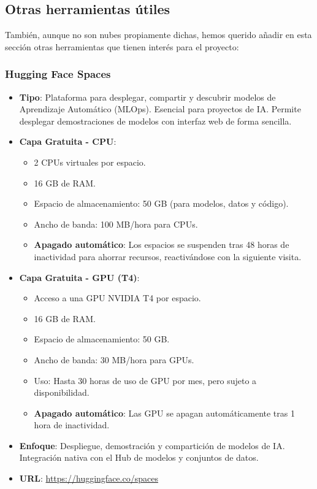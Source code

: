 \subsection{Otras herramientas útiles}

También, aunque no son nubes propiamente dichas, hemos querido añadir en esta sección otras herramientas que tienen interés para el proyecto:

\subsubsection*{Hugging Face Spaces}
\begin{itemize}
	\item \textbf{Tipo}: Plataforma para desplegar, compartir y descubrir modelos de Aprendizaje Automático (MLOps). Esencial para proyectos de IA. Permite desplegar demostraciones de modelos con interfaz web de forma sencilla.
	\item \textbf{Capa Gratuita - CPU}: 
	\begin{itemize}
		\item 2 CPUs virtuales por espacio.
		\item 16 GB de RAM.
		\item Espacio de almacenamiento: 50 GB (para modelos, datos y código).
		\item Ancho de banda: 100 MB/hora para CPUs.
		\item \textbf{Apagado automático}: Los espacios se suspenden tras 48 horas de inactividad para ahorrar recursos, reactivándose con la siguiente visita.
	\end{itemize}
	\item \textbf{Capa Gratuita - GPU (T4)}: 
	\begin{itemize}
		\item Acceso a una GPU NVIDIA T4 por espacio.
		\item 16 GB de RAM.
		\item Espacio de almacenamiento: 50 GB.
		\item Ancho de banda: 30 MB/hora para GPUs.
		\item Uso: Hasta 30 horas de uso de GPU por mes, pero sujeto a disponibilidad.
		\item \textbf{Apagado automático}: Las GPU se apagan automáticamente tras 1 hora de inactividad.
	\end{itemize}
	\item \textbf{Enfoque}: Despliegue, demostración y compartición de modelos de IA. Integración nativa con el Hub de modelos y conjuntos de datos.
	\item \textbf{URL}: \url{https://huggingface.co/spaces}
\end{itemize}

